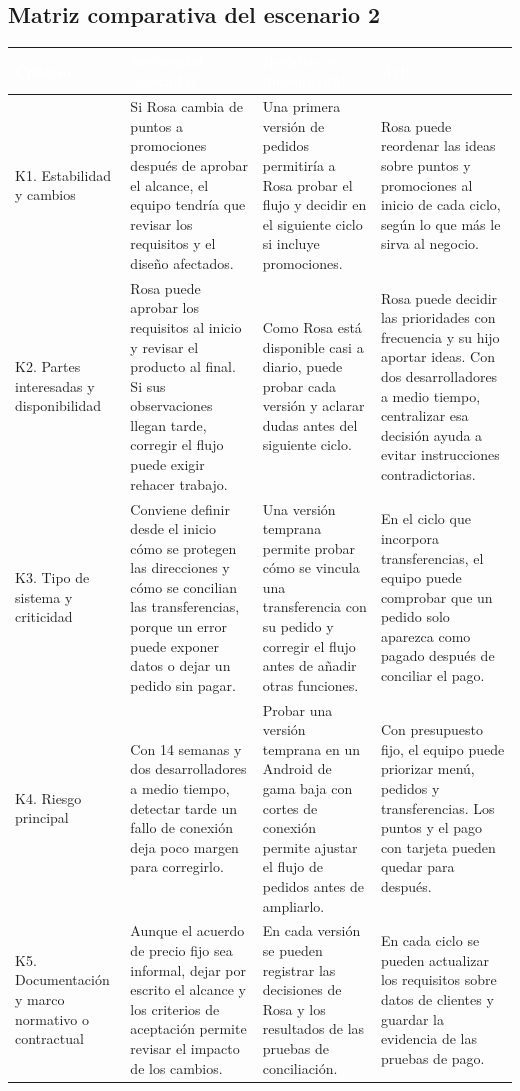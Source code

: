 \subsection{Matriz comparativa del escenario 2}

\begin{center}
\small
\begin{tabularx}{\textwidth}{|>{\raggedright\arraybackslash}p{2.6cm}|L|L|L|}
\hline
{}
\textcolor{white}{\textbf{Criterio}}
& \textcolor{white}{\textbf{Secuencial (cascada)}}
& \textcolor{white}{\textbf{Iterativo e incremental}}
& \textcolor{white}{\textbf{Ágil}} \\ \hline
K1. Estabilidad y cambios
& Si Rosa cambia de puntos a promociones después de aprobar el alcance, el equipo tendría que revisar los requisitos y el diseño afectados.
& Una primera versión de pedidos permitiría a Rosa probar el flujo y decidir en el siguiente ciclo si incluye promociones.
& Rosa puede reordenar las ideas sobre puntos y promociones al inicio de cada ciclo, según lo que más le sirva al negocio.
\\ \hline
K2. Partes interesadas y disponibilidad
& Rosa puede aprobar los requisitos al inicio y revisar el producto al final. Si sus observaciones llegan tarde, corregir el flujo puede exigir rehacer trabajo.
& Como Rosa está disponible casi a diario, puede probar cada versión y aclarar dudas antes del siguiente ciclo.
& Rosa puede decidir las prioridades con frecuencia y su hijo aportar ideas. Con dos desarrolladores a medio tiempo, centralizar esa decisión ayuda a evitar instrucciones contradictorias.
\\ \hline
K3. Tipo de sistema y criticidad
& Conviene definir desde el inicio cómo se protegen las direcciones y cómo se concilian las transferencias, porque un error puede exponer datos o dejar un pedido sin pagar.
& Una versión temprana permite probar cómo se vincula una transferencia con su pedido y corregir el flujo antes de añadir otras funciones.
& En el ciclo que incorpora transferencias, el equipo puede comprobar que un pedido solo aparezca como pagado después de conciliar el pago.
\\ \hline
K4. Riesgo principal
& Con 14 semanas y dos desarrolladores a medio tiempo, detectar tarde un fallo de conexión deja poco margen para corregirlo.
& Probar una versión temprana en un Android de gama baja con cortes de conexión permite ajustar el flujo de pedidos antes de ampliarlo.
& Con presupuesto fijo, el equipo puede priorizar menú, pedidos y transferencias. Los puntos y el pago con tarjeta pueden quedar para después.
\\ \hline
K5. Documentación y marco normativo o contractual
& Aunque el acuerdo de precio fijo sea informal, dejar por escrito el alcance y los criterios de aceptación permite revisar el impacto de los cambios.
& En cada versión se pueden registrar las decisiones de Rosa y los resultados de las pruebas de conciliación.
& En cada ciclo se pueden actualizar los requisitos sobre datos de clientes y guardar la evidencia de las pruebas de pago.
\\ \hline
\end{tabularx}
\end{center}

